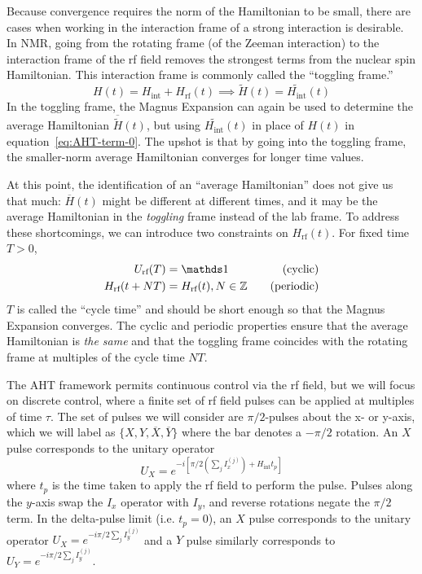 Because convergence requires the norm of the Hamiltonian to be small, there are cases when working in the interaction frame of a strong interaction is desirable. In NMR, going from the rotating frame (of the Zeeman interaction) to the interaction frame of the rf field removes the strongest terms from the nuclear spin Hamiltonian. This interaction frame is commonly called the ``toggling frame.''
\[
H(t) = H_{\text{int}} + H_{\text{rf}}(t) \implies \widetilde{H}(t) = \widetilde{H_{\text{int}}}(t)
\]
In the toggling frame, the Magnus Expansion can again be used to determine the average Hamiltonian $\overline{\widetilde{H}}(t)$, but using $\widetilde{H_{\text{int}}}(t)$ in place of $H(t)$ in equation~\ref{eq:AHT-term-0}. The upshot is that by going into the toggling frame, the smaller-norm average Hamiltonian converges for longer time values.

At this point, the identification of an ``average Hamiltonian'' does not give us that much: $\overline{H}(t)$ might be different at different times, and it may be the average Hamiltonian in the \emph{toggling} frame instead of the lab frame. To address these shortcomings, we can introduce two constraints on $H_\text{rf}(t)$. For fixed time $T>0$,
\begin{align}\label{eq:AHT-constraints}
    U_{\text{rf}}(T) &= \identity & \quad \text{(cyclic)} \\
    H_{\text{rf}}(t + NT) &= H_{\text{rf}}(t), N \in \Z & \quad \text{(periodic)}
\end{align}
$T$ is called the ``cycle time'' and should be short enough so that the Magnus Expansion converges.
The cyclic and periodic properties ensure that the average Hamiltonian is \emph{the same} and that the toggling frame coincides with the rotating frame at multiples of the cycle time $NT$.

The AHT framework permits continuous control via the rf field, but we will focus on discrete control, where a finite set of rf field pulses can be applied at multiples of time $\tau$. The set of pulses we will consider are $\pi/2$-pulses about the x- or y-axis, which we will label as $\{ X, Y, \overline{X}, \overline{Y} \}$ where the bar denotes a $-\pi/2$ rotation. An $X$ pulse corresponds to the unitary operator
\begin{equation}\label{eq:X-pulse}
    U_X = e^{-i [\pi/2 (\sum_j I_x^{(j)}) + H_{\text{int}} t_p]}
\end{equation}
where $t_p$ is the time taken to apply the rf field to perform the pulse. Pulses along the $y$-axis swap the $I_x$ operator with $I_y$, and reverse rotations negate the $\pi/2$ term. In the delta-pulse limit (i.e. $t_p = 0$), an $X$ pulse corresponds to the unitary operator $U_X = e^{-i \pi/2 \sum_j I_y^{(j)}}$ and a $Y$ pulse similarly corresponds to $U_Y = e^{-i \pi/2 \sum_j I_y^{(j)}}$.

